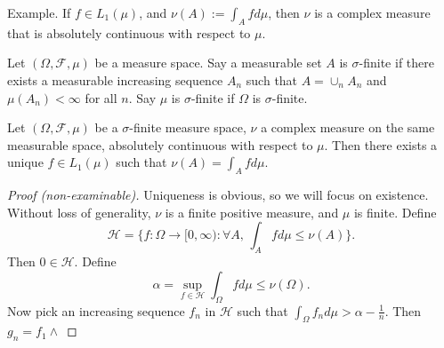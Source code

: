 Example. If $f\in L_1(\mu)$, and $\nu(A):=\int_A fd\mu$, then $\nu$ is a complex measure that is
absolutely continuous with respect to $\mu$.

Let $(\Omega, \mathcal{F},\mu)$ be a measure space. Say a measurable set $A$ is $\sigma$-finite
if there exists a measurable increasing sequence $A_n$ such that $A=\cup_n A_n$ and $\mu(A_n)<\infty$
for all $n$.
Say $\mu$ is $\sigma$-finite if $\Omega$ is $\sigma$-finite.

\begin{theorem} Let $(\Omega, \mathcal{F},\mu)$ be a $\sigma$-finite measure space,
  $\nu$ a complex measure on the same measurable space, absolutely continuous with respect to $\mu$.
  Then there exists a unique $f\in L_1(\mu)$ such that
  $\nu (A)=\int_A fd\mu$.
\end{theorem}

\begin{proof}[Proof (non-examinable)]
Uniqueness is obvious, so we will focus on existence.
Without loss of generality, $\nu$ is a finite positive measure,
and $\mu$ is finite.
Define $$\mathcal{H}=\{f:\Omega\to [0,\infty):\forall A,\,\int_A fd\mu \leq \nu(A) \}.$$
Then $0\in\mathcal{H}$.
Define $$\alpha=\sup_{f\in\mathcal{H}}\int_\Omega f d\mu \leq \nu(\Omega).$$
Now pick an increasing sequence $f_n$ in $\mathcal{H}$
such that $\int_\Omega f_n d\mu > \alpha-\frac{1}{n}$.
Then $g_n=f_1\wedge $
\end{proof}























%
